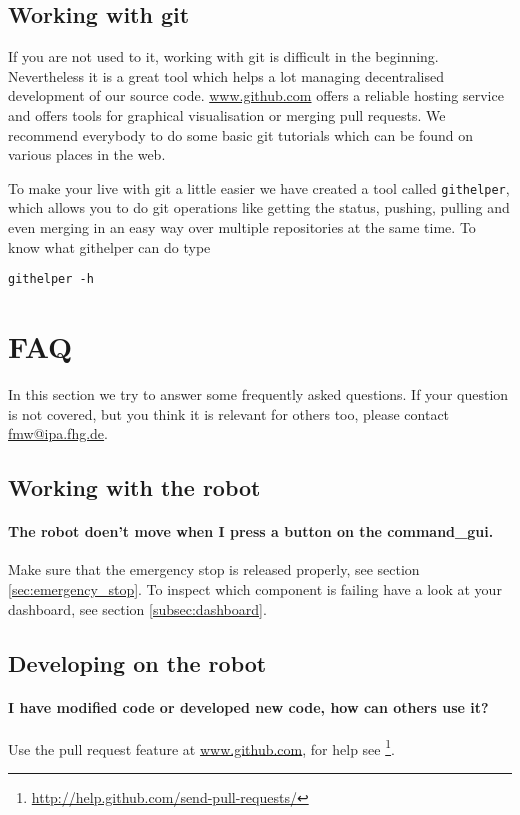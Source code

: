 \subsection{Working with git}
If you are not used to it, working with git is difficult in the beginning. Nevertheless it is a great tool which helps a lot managing decentralised development of our source code. \url{www.github.com} offers a reliable hosting service and offers tools for graphical visualisation or merging pull requests. We recommend everybody to do some basic git tutorials which can be found on various places in the web.

To make your live with git a little easier we have created a tool called \texttt{githelper}, which allows you to do git operations like getting the status, pushing, pulling and even merging in an easy way over multiple repositories at the same time. To know what githelper can do type
\begin{lstlisting}
githelper -h
\end{lstlisting}

\section{FAQ}
In this section we try to answer some frequently asked questions. If your question is not covered, but you think it is relevant for others too, please contact \href{mailto:fmw@ipa.fhg.de}{fmw@ipa.fhg.de}.

\subsection{Working with the robot}
\paragraph{The robot doen't move when I press a button on the command\_gui.}
Make sure that the emergency stop is released properly, see section \ref{sec:emergency_stop}. To inspect which component is failing have a look at your dashboard, see section \ref{subsec:dashboard}.

\subsection{Developing on the robot}
\paragraph{I have modified code or developed new code, how can others use it?}
Use the pull request feature at \url{www.github.com}, for help see \footnote{\url{http://help.github.com/send-pull-requests/}}.

